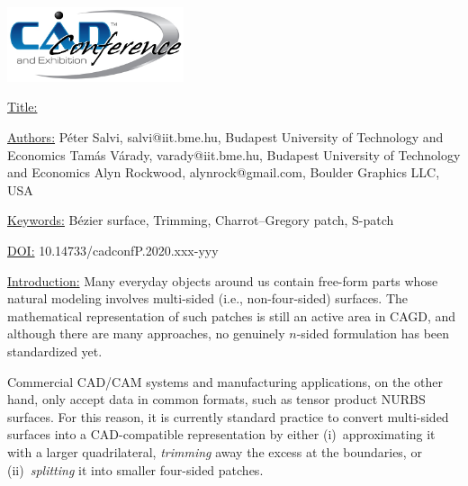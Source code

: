 \documentclass{article}
\begin{document}
{\centering  \includegraphics[width=5.173cm,height=2.193cm]{images/CADconverted-img001.jpg} \par}

\vspace{5pt}
\noindent
\underline{Title:}


\vspace{1em}
\noindent \underline{Authors:}
\newline
P\'eter Salvi, salvi@iit.bme.hu, Budapest University of Technology and Economics \newline
Tam\'as V\'arady, varady@iit.bme.hu, Budapest University of Technology and Economics \newline
Alyn Rockwood, alynrock@gmail.com, Boulder Graphics LLC, USA

\vspace{1em}
\noindent \underline{Keywords:}\newline
B\'ezier surface, Trimming, Charrot--Gregory patch, S-patch


\bigskip


\noindent \underline{DOI:} 10.14733/cadconfP.2020.xxx-yyy

\vspace{10pt}
\noindent\underline{Introduction:}\vspace{0.2em}\newline
Many everyday objects around us contain free-form parts whose natural modeling involves
multi-sided (i.e., non-four-sided) surfaces. The mathematical representation of such
patches is still an active area in CAGD, and although there are many approaches,
no genuinely $n$-sided formulation has been standardized yet.

Commercial CAD/CAM systems and manufacturing applications, on the other hand, only accept data
in common formats, such as tensor product NURBS surfaces. For this reason, it is currently
standard practice to convert multi-sided surfaces into  a CAD-compatible representation
by either (i)~approximating it with a larger quadrilateral, \emph{trimming} away the excess
at the boundaries, or (ii)~\emph{splitting} it into smaller four-sided patches.
\end{document}
